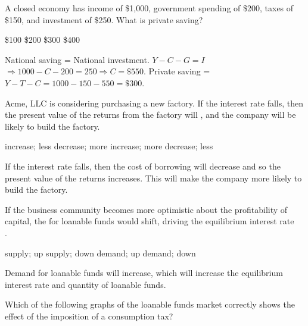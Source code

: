 \documentclass[addpoints,11pt]{exam}
\theoremstyle{definition}
\newcommand{\blank}[0]{\underline{\hspace{3cm}}}
\begin{document}
\begin{questions}
	

\question A closed economy has income of \$1,000, government spending of \$200, taxes of \$150, and investment of \$250. What is private saving?

\begin{choices}
	\choice \$100
	\choice \$200
	\CorrectChoice \$300
	\choice \$400
\end{choices}

\begin{solution}
	National saving = National investment. $Y - C - G = I$ $\Rightarrow 1000 - C - 200 = 250 \Rightarrow C = \$550$. Private saving = $Y - T - C = 1000 - 150 - 550 = \$300.$
\end{solution}

\question Acme, LLC is considering purchasing a new factory. If the interest rate falls, then the present value of the returns from the factory will \blank, and the company will be \\ \blank likely to build the factory.

\begin{choices}
	\choice increase; less
	\choice decrease; more
	\CorrectChoice increase; more
	\choice decrease; less
\end{choices}


\begin{solution}
	If the interest rate falls, then the cost of borrowing will decrease and so the present value of the returns increases. This will make the company more likely to build the factory.
\end{solution}


\newpage

\question If the business community becomes more optimistic about the profitability of capital, the \blank for loanable funds would shift, driving the equilibrium interest rate \\  \blank.

\begin{choices}
	\choice supply; up
	\choice supply; down
	\CorrectChoice demand; up
	\choice demand; down
\end{choices}

\begin{solution}
	Demand for loanable funds will increase, which will increase the equilibrium interest rate and quantity of loanable funds.
\end{solution}

\question Which of the following graphs of the loanable funds market correctly shows the effect of the imposition of a consumption tax?


\end{questions}
\end{document}
